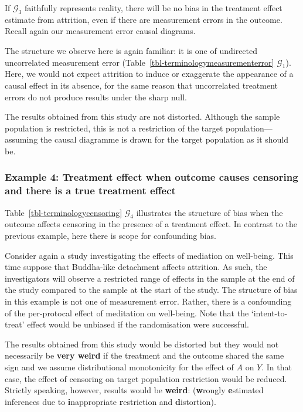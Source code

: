 \documentclass[
  single column]{article}
\begin{document}
If \(\mathcal{G}_3\) faithfully represents reality, there will be no
bias in the treatment effect estimate from attrition, even if there are
measurement errors in the outcome. Recall again our measurement error
causal diagrams.

The structure we observe here is again familiar: it is one of undirected
uncorrelated measurement error
(Table~\ref{tbl-terminologymeasurementerror} \(\mathcal{G}_1\)). Here,
we would not expect attrition to induce or exaggerate the appearance of
a causal effect in its absence, for the same reason that uncorrelated
treatment errors do not produce results under the sharp null.

The results obtained from this study are not distorted. Although the
sample population is restricted, this is not a restriction of the target
population---assuming the causal diagramme is drawn for the target
population as it should be.

\subsubsection{Example 4: Treatment effect when outcome causes censoring
and there is a true treatment
effect}\label{example-4-treatment-effect-when-outcome-causes-censoring-and-there-is-a-true-treatment-effect}

Table~\ref{tbl-terminologycensoring} \(\mathcal{G}_4\) illustrates the
structure of bias when the outcome affects censoring in the presence of
a treatment effect. In contrast to the previous example, here there is
scope for confounding bias.

Consider again a study investigating the effects of mediation on
well-being. This time suppose that Buddha-like detachment affects
attrition. As such, the investigators will observe a restricted range of
effects in the sample at the end of the study compared to the sample at
the start of the study. The structure of bias in this example is not one
of measurement error. Rather, there is a confounding of the per-protocal
effect of meditation on well-being. Note that the `intent-to-treat'
effect would be unbiased if the randomisation were successful.

The results obtained from this study would be distorted but they would
not necessarily be \textbf{very weird} if the treatment and the outcome
shared the same sign and we assume distributional monotonicity for the
effect of \(A\) on \(Y\). In that case, the effect of censoring on
target population restriction would be reduced. Strictly speaking,
however, results would be \textbf{weird}: (\textbf{w}rongly
\textbf{e}stimated inferences due to \textbf{i}nappropriate
\textbf{r}estriction and \textbf{d}istortion).
\end{document}
